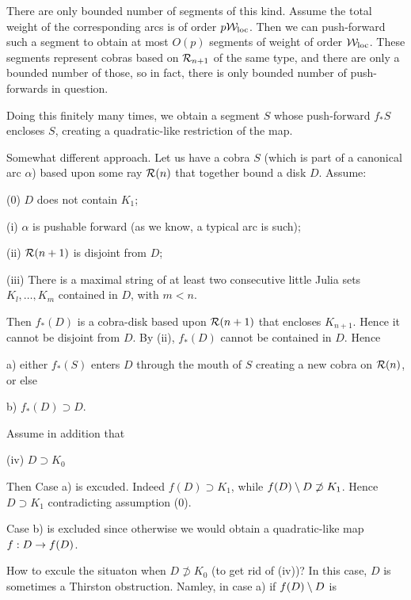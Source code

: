 {{


There are only bounded number of segments of this kind.   
Assume the total weight of the corresponding arcs is of order
$p{\mathcal W}_{\mathrm{loc}}$. Then we can push-forward such a segment to obtain at
most $O(p)$ segments of weight of order ${\mathcal W}_{\mathrm{loc}}$. These segments
represent cobras based on ${\mathcal R}_{n+1}$ of the same type, and there are
only a bounded number  of those,    
so in fact, there is only bounded
number of push-forwards in question.  

Doing this finitely many times,  we obtain a segment $S$  whose
push-forward $f_*S$ encloses $S$, creating a quadratic-like
restriction of the map.   

\msk
Somewhat different approach. 
Let us  have a cobra $S$ (which is part of a canonical arc $\alpha$) 
 based upon some ray ${\mathcal R}(n)$ that together
bound a disk $D$. 
Assume:

\ssk \nin (0)
  $D$ does not contain $K_1 $; 

\ssk \nin (i)
 $\alpha$ is pushable forward 
(as we know, a typical arc is such);  

\ssk\nin (ii)
 ${\mathcal R}(n+1)$ is disjoint from $D$;

\ssk\nin (iii) 
There is  a maximal string of at least two consecutive  little Julia sets 
$K_l , \dots , K_m$ contained in $D$, with $m< n$. 

\ssk
Then $f_* (D)$ 
is a cobra-disk  based upon ${\mathcal R}(n+1)$ 
that encloses $K_{n+1}$. Hence it cannot be disjoint from $D$.
By (ii), $f_*(D)$ cannot be contained in $D$. 
Hence 

\ssk\nin
a) either $f_*(S)$ enters $D$ through the mouth of $S$ creating a new
cobra on ${\mathcal R}(n)$, or else  

\ssk \nin
b)  $f_*(D)\supset D$. 

\ssk\nin 
Assume in addition that

\ssk\nin (iv) 
 $D\supset K_0$

\ssk
 Then Case a) is excuded. Indeed $ f(D) \supset K_1$, 
while $f(D) \setminus D \not\supset K_1$.  
Hence $D\supset K_1$ contradicting assumption (0).  

Case  b)  is excluded since otherwise we would obtain 
a  %
quadratic-like map $f: D\rightarrow f  (D) $.

\ssk 
How to excule the situaton when $D\not\supset K_0$ (to get rid of
(iv))? In this case, $D$ is sometimes a Thirston obstruction.
Namley, in case a) if $f(D)\setminus D $ is 

}}
